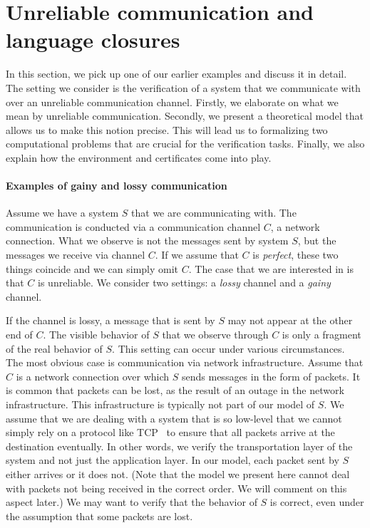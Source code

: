 \documentclass[../../diss.tex]{subfiles}
\begin{document}
\section{Unreliable communication and language closures}%
\label{Section:IntroClosures}%

In this section, we pick up one of our earlier examples and discuss it in detail.
The setting we consider is the verification of a system that we communicate with over an unreliable communication channel.
Firstly, we elaborate on what we mean by unreliable communication.
Secondly, we present a theoretical model that allows us to make this notion precise.
This will lead us to formalizing two computational problems that are crucial for the verification tasks.
Finally, we also explain how the environment and certificates come into play.

\paragraph{Examples of gainy and lossy communication}

Assume we have a system $S$ that we are communicating with.
The communication is conducted via a communication channel $C$, \eg a network connection.
What we observe is not the messages sent by system $S$, but the messages we receive via channel $C$.
If we assume that $C$ is \emph{perfect}, these two things coincide and we can simply omit $C$.
The case that we are interested in is that $C$ is unreliable.
We consider two settings: a \emph{lossy} channel and a \emph{gainy} channel.

If the channel is lossy, a message that is sent by $S$ may not appear at the other end of $C$.
The visible behavior of $S$ that we observe through $C$ is only a fragment of the real behavior of $S$.
This setting can occur under various circumstances.
The most obvious case is communication via network infrastructure.
Assume that $C$ is a network connection over which $S$ sends messages in the form of packets.
It is common that packets can be lost, \eg as the result of an outage in the network infrastructure.
This infrastructure is typically not part of our model of $S$.
We assume that we are dealing with a system that is so low-level that we cannot simply rely on a protocol like TCP~\cite{TCP} to ensure that all packets arrive at the destination eventually.
In other words, we verify the transportation layer of the system and not just the application layer.
In our model, each packet sent by $S$ either arrives or it does not.
(Note that the model we present here cannot deal with packets not being received in the correct order. We will comment on this aspect later.)
We may want to verify that the behavior of $S$ is correct, even under the assumption that some packets are lost.
\end{document}
